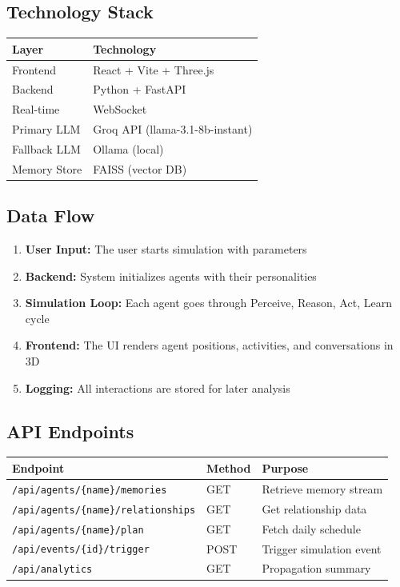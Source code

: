 \documentclass[12pt,a4paper]{article}
\begin{document}
\subsection{Technology Stack}

\begin{table}[H]
\centering
\small
\begin{tabular}{|l|l|}
\hline
\textbf{Layer} & \textbf{Technology} \\
\hline
Frontend & React + Vite + Three.js \\
Backend & Python + FastAPI \\
Real-time & WebSocket \\
Primary LLM & Groq API (llama-3.1-8b-instant) \\
Fallback LLM & Ollama (local) \\
Memory Store & FAISS (vector DB) \\
\hline
\end{tabular}
\end{table}

\subsection{Data Flow}

\begin{enumerate}[leftmargin=*]
    \item \textbf{User Input:} The user starts simulation with parameters
    \item \textbf{Backend:} System initializes agents with their personalities
    \item \textbf{Simulation Loop:} Each agent goes through Perceive, Reason, Act, Learn cycle
    \item \textbf{Frontend:} The UI renders agent positions, activities, and conversations in 3D
    \item \textbf{Logging:} All interactions are stored for later analysis
\end{enumerate}

\subsection{API Endpoints}

\begin{table}[H]
\centering
\small
\begin{tabular}{|l|l|l|}
\hline
\textbf{Endpoint} & \textbf{Method} & \textbf{Purpose} \\
\hline
\texttt{/api/agents/\{name\}/memories} & GET & Retrieve memory stream \\
\texttt{/api/agents/\{name\}/relationships} & GET & Get relationship data \\
\texttt{/api/agents/\{name\}/plan} & GET & Fetch daily schedule \\
\texttt{/api/events/\{id\}/trigger} & POST & Trigger simulation event \\
\texttt{/api/analytics} & GET & Propagation summary \\
\hline
\end{tabular}
\end{table}
\end{document}
